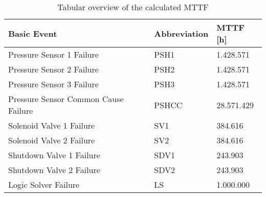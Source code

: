 \begin{table}[!ht]
\centering
\renewcommand{\arraystretch}{1.4}
\label{tab:mttf}
\begin{tabular}{|l|l|l|}
\hline
\textbf{Basic Event}                  & \textbf{Abbreviation} & \textbf{MTTF [h]}         \\ \hline
Pressure Sensor 1 Failure             & PSH1                      & 1.428.571                   \\\hline
Pressure Sensor 2 Failure             & PSH2                      &  1.428.571      \\ \hline
Pressure Sensor 3 Failure             & PSH3                      &   1.428.571            \\ \hline
Pressure Sensor Common Cause Failure & PSHCC                     &   28.571.429          \\ \hline
Solenoid Valve 1 Failure             & SV1                       & 384.616 \\ \hline
Solenoid Valve 2 Failure             & SV2                       &  384.616 \\ \hline
Shutdown Valve 1 Failure             & SDV1                      & 243.903\\ \hline
Shutdown Valve 2 Failure             & SDV2                      & 243.903    \\ \hline
Logic Solver Failure                 & LS                        & 1.000.000           \\ \hline
\end{tabular}
\caption{Tabular overview of the calculated MTTF}
\end{table}


